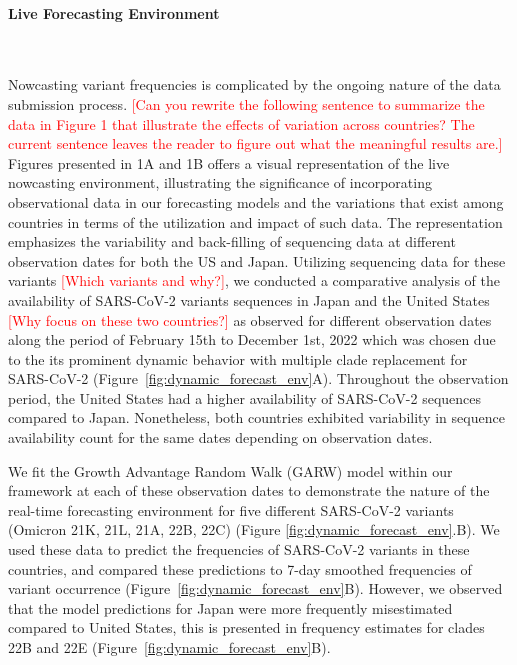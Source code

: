 \documentclass[11pt,oneside,letterpaper]{article}
\def\jhc#1{\textcolor{red}{[#1]}}
\begin{document}

\paragraph{Live Forecasting Environment}\

Nowcasting variant frequencies is complicated by the ongoing nature of the data submission process.
\jhc{Can you rewrite the following sentence to summarize the data in Figure 1 that illustrate the effects of variation across countries? The current sentence leaves the reader to figure out what the meaningful results are.}
Figures presented in 1A and 1B offers a visual representation of the live nowcasting environment, illustrating the significance of incorporating observational data in our forecasting models and the variations that exist among countries in terms of the utilization and impact of such data.
The representation emphasizes the variability and back-filling of sequencing data at different observation dates for both the US and Japan. 
Utilizing sequencing data for these variants \jhc{Which variants and why?}, we conducted a comparative analysis of the availability of SARS-CoV-2 variants sequences in Japan and the United States \jhc{Why focus on these two countries?} as observed for different observation dates along the period of February 15th to December 1st, 2022 which was chosen due to the its prominent dynamic behavior with multiple clade replacement for SARS-CoV-2 \cite{:ck_markov_covid}  (Figure~\ref{fig:dynamic_forecast_env}A).
Throughout the observation period, the United States had a higher availability of SARS-CoV-2 sequences compared to Japan.
Nonetheless, both countries exhibited variability in sequence availability count for the same dates depending on observation dates. 


We fit the Growth Advantage Random Walk (GARW) model within our framework at each of these observation dates to demonstrate the nature of the real-time forecasting environment for five different SARS-CoV-2 variants (Omicron 21K, 21L, 21A, 22B, 22C) (Figure \ref{fig:dynamic_forecast_env}.B).
We used these data to predict the frequencies of SARS-CoV-2 variants in these countries, and compared these predictions to 7-day smoothed frequencies of variant occurrence (Figure~\ref{fig:dynamic_forecast_env}B).
However, we observed that the model predictions for Japan were more frequently misestimated compared to United States, this is presented in frequency estimates for clades 22B and 22E (Figure~\ref{fig:dynamic_forecast_env}B).
\end{document}
